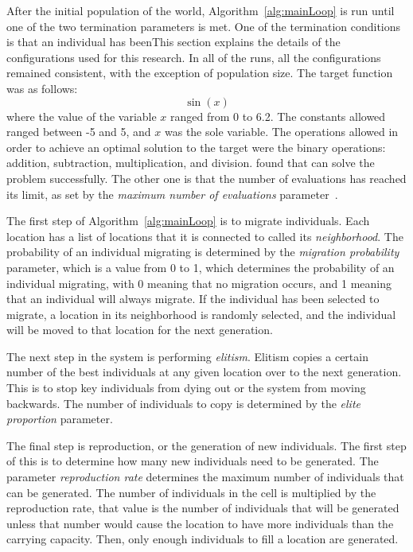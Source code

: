 \documentclass[12pt]{article}
\begin{document}
After the initial population of the world, Algorithm~\ref{alg:mainLoop} is run until one of the two termination parameters is met. One of the termination conditions is that an individual has beenThis section explains the details of the configurations used for this research. In all of the runs, all the configurations remained consistent, with the exception of population size. The target function was as follows:
\[
	\sin(x)
\]
where the value of the variable $x$ ranged from 0 to 6.2. The constants allowed ranged between -5 and 5, and $x$ was the sole variable. The operations allowed in order to achieve an optimal solution to the target were the binary operations: addition, subtraction, multiplication, and division. found that can solve the problem successfully. The other one is that the number of evaluations has reached its limit, as set by the \emph{maximum number of evaluations} parameter~\cite{Gottlieb:2002:EAS:638548.638550}.

The first step of Algorithm~\ref{alg:mainLoop} is to migrate individuals. Each location has a list of locations that it is connected to called its \emph{neighborhood}. The probability of an individual migrating is determined by the \emph{migration probability} parameter, which is a value from 0 to 1, which determines the probability of an individual migrating, with 0 meaning that no migration occurs, and 1 meaning that an individual will always migrate. If the individual has been selected to migrate, a location in its neighborhood is randomly selected, and the individual will be moved to that location for the next generation.

The next step in the system is performing \emph{elitism}. Elitism copies a certain number of the best individuals at any given location over to the next generation. This is to stop key individuals from dying out or the system from moving backwards. The number of individuals to copy is determined by the \emph{elite proportion} parameter.

The final step is reproduction, or the generation of new individuals. The first step of this is to determine how many new individuals need to be generated. The parameter \emph{reproduction rate} determines the maximum number of individuals that can be generated. The number of individuals in the cell is multiplied by the reproduction rate, that value is the number of individuals that will be generated unless that number would cause the location to have more individuals than the carrying capacity. Then, only enough individuals to fill a location are generated.
\end{document}
